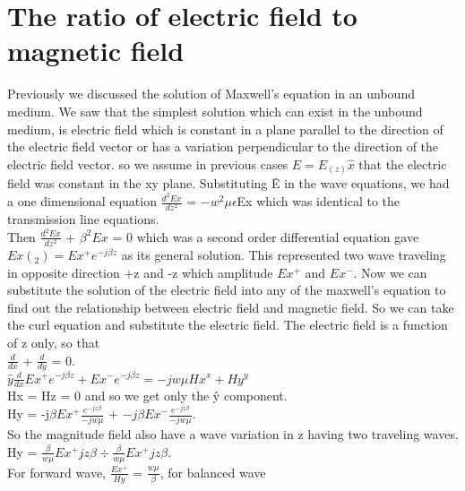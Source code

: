 \chapter{The ratio of electric field to magnetic field}
Previously we discussed the solution of  Maxwell's equation in an unbound medium. We saw that the simplest solution which can exist in the unbound medium, is electric field which is constant in a plane parallel to the direction of the electric field vector or has a variation perpendicular to the direction of the electric field vector. so we assume in previous cases $\hat{E}=E_(z)\hat{x}$ that the electric field was constant in the xy plane. Substituting \={E} in the wave equations, we had a one dimensional equation $\frac{d^2Ex}{dz^2}$ = $-w^2 \mu\epsilon$Ex which was identical to the transmission line equations. \\
	
	Then $\frac{d^2Ex}{dz^2}$ + $\beta^2 Ex$ = 0 which was a second order differential equation gave $Ex(_{2}) = Ex^{+}e^{-j\beta z}$ as its general solution. This represented two wave traveling in opposite direction +z and -z which amplitude $Ex^{+}$ and $Ex^{-}$. Now we can substitute the solution of the electric field into any of the maxwell's equation to find out the relationship between electric field and magnetic field. So we can take the curl equation and substitute the electric field. The electric field is a function of z only, so that\\
	
	$\frac{d}{dx}$ + $\frac{d}{dy}$ = 0.\\
	
	$\hat{y} \frac{d}{dx} Ex^{+} e^{-j \beta z} + Ex^{-} e^{-j\beta z} = -jw \mu Hx^{x} + Hy^
				{y}$
			\\
			Hx = Hz = 0 and so we get only the \^{y} component.\\
			
			
			Hy = -j$\beta Ex^{+}\frac{e^{-jz\beta}}{-jw\mu}$ + $-j \beta Ex^{-}\frac{e^{-jz\beta}}{-jw\mu}$.\\
			
			So the magnitude field also have a wave variation in z having two traveling waves. \\
			
			Hy = $\frac{\beta}{w\mu}Ex^{+}jz\beta \div \frac{\beta}{w\mu}Ex^{+}jz\beta$.\\
			
			For forward wave, $\frac{Ex^+}{Hy}$ = $\frac{w\mu}{\beta}$, for balanced wave \\
			

